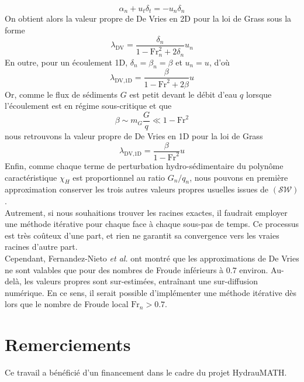 \documentclass[11pt, a4paper, oneside]{report}
\begin{document}
\begin{appendices}
\begin{equation}
    \alpha_n + u_t \delta_t = - u_n \delta_n
\end{equation}
On obtient alors la valeur propre de De Vries en 2D pour la loi de Grass sous la forme
\begin{equation}
    \lambda_\text{DV} = \frac{\delta_n}{1 - \text{Fr}_n^2 + 2 \delta_n} u_n
\end{equation}
En outre, pour un écoulement 1D, $\delta_n = \beta_n = \beta$ et $u_n = u$, d'où
\begin{equation}
    \lambda_\text{DV,1D} = \frac{\beta}{1 - \text{Fr}^2 + 2 \beta} u
\end{equation}
Or, comme le flux de sédiments $G$ est petit devant le débit d'eau $q$ lorsque l'écoulement est en régime sous-critique et que
\begin{equation}
    \beta \sim m_G \frac{G}{q} \ll 1 - \text{Fr}^2
\end{equation}
nous retrouvons la valeur propre de De Vries en 1D pour la loi de Grass \cite{fernandez2025third, vries1965considerations}
\begin{equation}
    \lambda_\text{DV,1D} = \frac{\beta}{1 - \text{Fr}^2} u
\end{equation}
Enfin, comme chaque terme de perturbation hydro-sédimentaire du polynôme caractéristique $\chi_H$ est proportionnel au ratio $G_n/q_n$, nous pouvons en première approximation conserver les trois autres valeurs propres usuelles issues de $(\mathcal{SW})$. \\
Autrement, si nous souhaitions trouver les racines exactes, il faudrait employer une méthode itérative pour chaque face à chaque sous-pas de temps. Ce processus est très coûteux d'une part, et rien ne garantit sa convergence vers les vraies racines d'autre part. \\
Cependant, Fernandez-Nieto \textit{et al.} \cite{fernandez2025third} ont montré que les approximations de De Vries ne sont valables que pour des nombres de Froude inférieurs à $0.7$ environ. Au-delà, les valeurs propres sont sur-estimées, entraînant une sur-diffusion numérique. En ce sens, il serait possible d'implémenter une méthode itérative dès lors que le nombre de Froude local $\text{Fr}_n > 0.7$.

\end{appendices}

\newpage
\section*{Remerciements}

Ce travail a bénéficié d'un financement dans le cadre du projet HydrauMATH.



\end{document}
